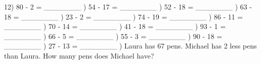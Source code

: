 \documentclass{article}%
\begin{document}
12) 80 {-} 2 = \_\_\_\_\_\_\_%
\newline%
\newline%
) 54 {-} 17 = \_\_\_\_\_\_\_%
\newline%
\newline%
) 52 {-} 18 = \_\_\_\_\_\_\_%
\newline%
\newline%
) 63 {-} 18 = \_\_\_\_\_\_\_%
\newline%
\newline%
) 23 {-} 2 = \_\_\_\_\_\_\_%
\newline%
\newline%
) 74 {-} 19 = \_\_\_\_\_\_\_%
\newline%
\newline%
) 86 {-} 11 = \_\_\_\_\_\_\_%
\newline%
\newline%
) 70 {-} 14 = \_\_\_\_\_\_\_%
\newline%
\newline%
) 41 {-} 18 = \_\_\_\_\_\_\_%
\newline%
\newline%
) 93 {-} 1 = \_\_\_\_\_\_\_%
\newline%
\newline%
) 66 {-} 5 = \_\_\_\_\_\_\_%
\newline%
\newline%
) 55 {-} 3 = \_\_\_\_\_\_\_%
\newline%
\newline%
) 90 {-} 18 = \_\_\_\_\_\_\_%
\newline%
\newline%
) 27 {-} 13 = \_\_\_\_\_\_\_%
\newline%
\newline%
) Laura has 67 pens. Michael has 2 less pens than Laura. How many pens does Michael have?%
\end{document}
